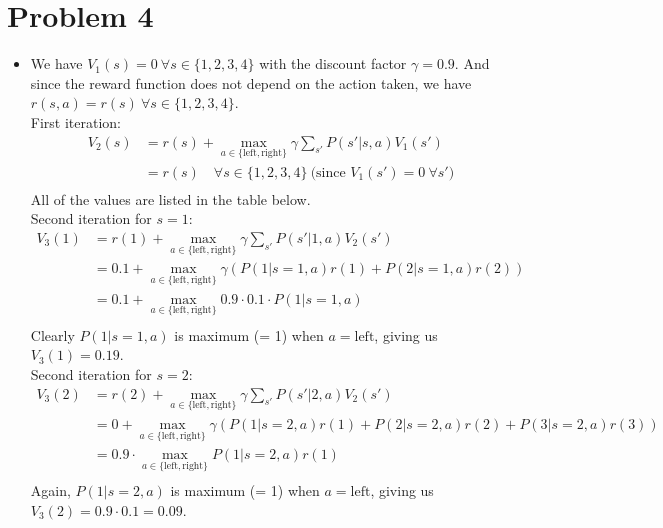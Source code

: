 \documentclass{article}
\begin{document}
\section{Problem 4}
  \begin{itemize}
    \item[\textbf{4.1}] We have $V_1(s) = 0 ~ \forall s \in \{1, 2, 3, 4\}$ with the discount factor $\gamma = 0.9$.
    And since the reward function does not depend on the action taken, we have $r(s, a) = r(s) ~ \forall s \in \{1, 2, 3, 4\}$. \\
    First iteration: \\
    \begin{align*}
      V_2(s) &= r(s) + \max_{a \in \{\text{left}, \text{right}\}} \gamma \sum_{s'} P(s' | s, a) V_1(s') \\
      &= r(s) \quad \forall s \in \{1, 2, 3, 4\} ~ \text{(since $V_1(s') = 0 ~ \forall s'$)} \\
    \end{align*}
    All of the values are listed in the table below. \\
    Second iteration for $s = 1$: \\
    \begin{align*}
      V_3(1) &= r(1) + \max_{a \in \{\text{left}, \text{right}\}} \gamma \sum_{s'} P(s' | 1, a) V_2(s') \\
      &= 0.1 + \max_{a \in \{\text{left}, \text{right}\}} \gamma (P(1|s=1, a)r(1) + P(2|s=1, a)r(2)) \\
      &= 0.1 + \max_{a \in \{\text{left}, \text{right}\}} 0.9 \cdot 0.1 \cdot P(1|s=1, a) \\
    \end{align*}
    Clearly $P(1|s=1, a)$ is maximum (= 1) when $a = \text{left}$, giving us $V_3(1) = 0.19$. \\
    Second iteration for $s = 2$: \\
    \begin{align*}
      V_3(2) &= r(2) + \max_{a \in \{\text{left}, \text{right}\}} \gamma \sum_{s'} P(s' | 2, a) V_2(s') \\
      &= 0 + \max_{a \in \{\text{left}, \text{right}\}} \gamma (P(1|s=2, a)r(1) + P(2|s=2, a)r(2) + P(3|s=2, a)r(3)) \\
      &= 0.9 \cdot \max_{a \in \{\text{left}, \text{right}\}} P(1|s=2, a)r(1) \\
    \end{align*}
    Again, $P(1|s=2, a)$ is maximum (= 1) when $a = \text{left}$, giving us $V_3(2) = 0.9 \cdot 0.1 = 0.09$. \\

\end{itemize}
\end{document}
